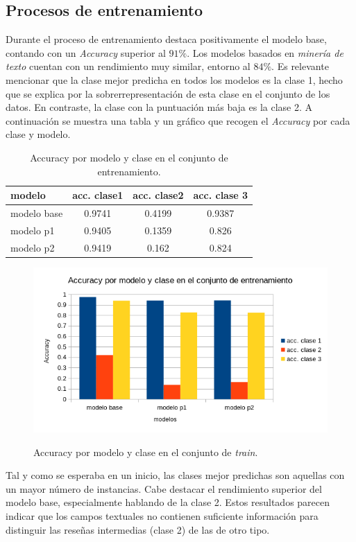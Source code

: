 \documentclass[es]{uc3mreport}
\begin{document}
\begin{report}
\subsection{Procesos de entrenamiento}
\label{subsec:comparar_train}
Durante el proceso de entrenamiento destaca positivamente el modelo base,
contando con un \textit{Accuracy} superior al $91\%$. Los modelos basados en
\textit{minería de texto} cuentan con un rendimiento muy similar, entorno al
$84\%$. Es relevante mencionar que la clase mejor predicha en todos los modelos
es la clase 1, hecho que se explica por la sobrerrepresentación de esta clase en
el conjunto de los datos. En contraste, la clase con la puntuación más baja es
la clase 2. A continuación se muestra una tabla y un gráfico que recogen el
\textit{Accuracy} por cada clase y modelo.
\begin{table}[H]
\center
\begin{tabular}{@{}lccc@{}}
    \toprule
    modelo      & acc. clase1&	acc. clase2	& acc. clase 3 \\
    \midrule     
    modelo base & 0.9741 & 0.4199	& 0.9387 \\
    modelo p1   & 0.9405 & 0.1359	& 0.826 \\
    modelo p2   & 0.9419 & 0.162	& 0.824 \\
    \bottomrule
\end{tabular}
    \caption{Accuracy por modelo y clase en el conjunto de entrenamiento.}
\end{table}
\begin{figure}[H]
    \center
    \includegraphics[width=0.85\linewidth]{accModClassTrain.png}\\
    \caption{Accuracy por modelo y clase en el conjunto de \textit{train}.}
\end{figure}

Tal y como se esperaba en un inicio, las clases mejor predichas son aquellas con
un mayor número de instancias. Cabe destacar el rendimiento superior del modelo
base, especialmente hablando de la clase 2. Estos resultados parecen indicar que
los campos textuales no contienen suficiente información para distinguir las
reseñas intermedias (clase 2) de las de otro tipo.


\end{report}
\end{document}
